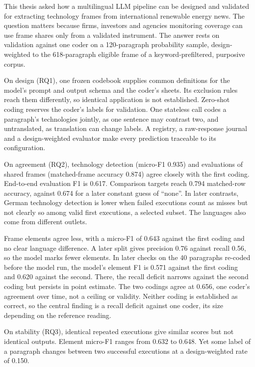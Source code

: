 This thesis asked how a multilingual LLM pipeline can be designed and validated for extracting technology frames from international renewable energy news. The question matters because firms, investors and agencies monitoring coverage can use frame shares only from a validated instrument. The answer rests on validation against one coder on a 120-paragraph probability sample, design-weighted to the 618-paragraph eligible frame of a keyword-prefiltered, purposive corpus.

On design (RQ1), one frozen codebook supplies common definitions for the model's prompt and output schema and the coder's sheets. Its exclusion rules reach them differently, so identical application is not established. Zero-shot coding reserves the coder's labels for validation. One stateless call codes a paragraph's technologies jointly, as one sentence may contrast two, and untranslated, as translation can change labels. A registry, a raw-response journal and a design-weighted evaluator make every prediction traceable to its configuration.

On agreement (RQ2), technology detection (micro-F1 0.935) and evaluations of shared frames (matched-frame accuracy 0.874) agree closely with the first coding. End-to-end evaluation F1 is 0.617. Comparison targets reach 0.794 matched-row accuracy, against 0.674 for a later constant guess of ``none''. In later contrasts, German technology detection is lower when failed executions count as misses but not clearly so among valid first executions, a selected subset. The languages also come from different outlets.

Frame elements agree less, with a micro-F1 of 0.643 against the first coding and no clear language difference. A later split gives precision 0.76 against recall 0.56, so the model marks fewer elements. In later checks on the 40 paragraphs re-coded before the model run, the model's element F1 is 0.571 against the first coding and 0.620 against the second. There, the recall deficit narrows against the second coding but persists in point estimate. The two codings agree at 0.656, one coder's agreement over time, not a ceiling or validity. Neither coding is established as correct, so the central finding is a recall deficit against one coder, its size depending on the reference reading.

On stability (RQ3), identical repeated executions give similar scores but not identical outputs. Element micro-F1 ranges from 0.632 to 0.648. Yet some label of a paragraph changes between two successful executions at a design-weighted rate of 0.150.

